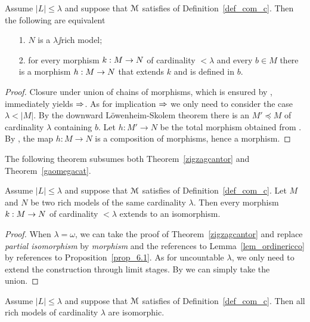 \documentclass[creche.tex]{subfiles}
\begin{document}
\begin{proposition}\label{prop_6.1}
Assume $|L|\le\lambda$ and suppose that $\EuScript M$ satisfies  of Definition~\ref{def_com_c}. Then the following are equivalent
\begin{itemize}
\item[1.] $N$ is a $\lambda\jj$rich model;
\item[2.]for every morphism $k:M\rightarrow N$ of cardinality $<\lambda$ and every $b\in M$ there is a morphism $h:M\rightarrow N$ that extends $k$ and is defined in $b$.
\end{itemize}
\end{proposition}
\begin{proof}
Closure under union of chains of morphisms, which is ensured by , immediately yields $\Rightarrow$. As for implication $\Rightarrow$ we only need to consider the case $\lambda<|M|$.  By the downward L\"owenheim-Skolem theorem there is an  $M'\preceq M$ of cardinality $\lambda$ containing $b$. Let $h:M'\to N$ be the total morphism obtained from . By , the map  $h:M\to N$ is a composition of morphisms, hence a morphism.
\end{proof}

The following theorem subsumes both Theorem~\ref{zigzagcantor} and Theorem~\ref{gaomegacat}.

\begin{theorem}\label{thm_riccozigzag}
Assume $|L|\le\lambda$ and suppose that $\EuScript M$ satisfies  of Definition~\ref{def_com_c}. Let $M$ and $N$ be two rich models of the same cardinality $\lambda$. Then every morphism $k:M\rightarrow N$ of cardinality $<\lambda$ extends to an isomorphism.
\end{theorem}

\begin{proof}
When $\lambda=\omega$, we can take the proof of Theorem~\ref{zigzagcantor} and replace \textit{partial isomorphism\/} by \textit{morphism\/} and the references to Lemma~\ref{lem_ordinericco} by references to Proposition~\ref{prop_6.1}. As for uncountable $\lambda$, we only need to extend the construction through limit stages. By  we can simply take the union.
\end{proof}


\begin{corollary}\label{coroll_riccozigzag}
Assume $|L|\le\lambda$ and suppose that $\EuScript M$ satisfies  of Definition~\ref{def_com_c}. Then all rich models of cardinality $\lambda$ are isomorphic.\QED
\end{corollary}
\end{document}
